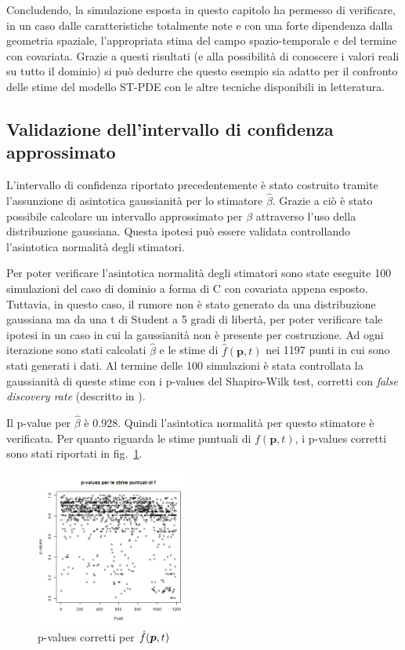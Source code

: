 \documentclass[a4paper,11pt,twoside,openright]{book}							%
\begin{document}
Concludendo, la simulazione esposta in questo capitolo ha permesso di verificare, in un caso dalle caratteristiche totalmente note e con una forte dipendenza dalla geometria spaziale, l'appropriata stima del campo spazio-temporale e del termine con covariata. Grazie a questi risultati (e alla possibilità di conoscere i valori reali su tutto il dominio) si può dedurre che questo esempio sia adatto per il confronto delle stime del modello ST-PDE con le altre tecniche disponibili in letteratura.

\subsection{Validazione dell'intervallo di confidenza approssimato}
L'intervallo di confidenza riportato precedentemente è stato costruito tramite l'assunzione di asintotica gaussianità per lo stimatore $\hat{\beta}$. Grazie a ciò è stato possibile calcolare un intervallo approssimato per $\beta$ attraverso l'uso della distribuzione gaussiana. Questa ipotesi può essere validata controllando l'asintotica normalità degli stimatori.

Per poter verificare l'asintotica normalità degli stimatori sono state eseguite 100 simulazioni del caso di dominio a forma di C con covariata appena esposto. Tuttavia, in questo caso, il rumore non è stato generato da una distribuzione gaussiana ma da una t di Student a 5 gradi di libertà, per poter verificare tale ipotesi in un caso in cui la gaussianità non è presente per costruzione. Ad ogni iterazione sono stati calcolati $\hat{\beta}$ e le stime di $\hat{f}(\bm p,t)$ nei 1197 punti in cui sono stati generati i dati. Al termine delle 100 simulazioni è stata controllata la gaussianità di queste stime con i p-values del Shapiro-Wilk test, corretti con \textit{false discovery rate} (descritto in \cite{art:fdr}). 

Il p-value per $\hat{\beta}$ è 0.928. Quindi l'asintotica normalità per questo stimatore è verificata. Per quanto riguarda le stime puntuali di $f(\bm p,t)$, i p-values corretti sono stati riportati in fig.~\ref{fig:pval}.
\begin{figure}[h]
	\centering
	\includegraphics[width=0.46\textwidth]{Immagini/pval.png}  
	\caption{p-values corretti per $\protect\hat{f}(\bm p,t)$}
		\label{fig:pval}
\end{figure}
\end{document}
